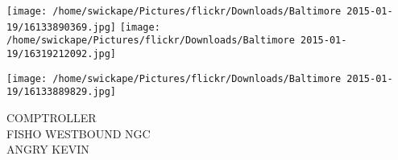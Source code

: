\documentclass[10pt,letterpaper]{article}
\begin{document}
\texttt{[image: /home/swickape/Pictures/flickr/Downloads/Baltimore 2015-01-19/16133890369.jpg]}
\texttt{[image: /home/swickape/Pictures/flickr/Downloads/Baltimore 2015-01-19/16319212092.jpg]}

\texttt{[image: /home/swickape/Pictures/flickr/Downloads/Baltimore 2015-01-19/16133889829.jpg]}

COMPTROLLER\\
FISHO WESTBOUND NGC\\
ANGRY KEVIN\\
\pagebreak
\end{document}

